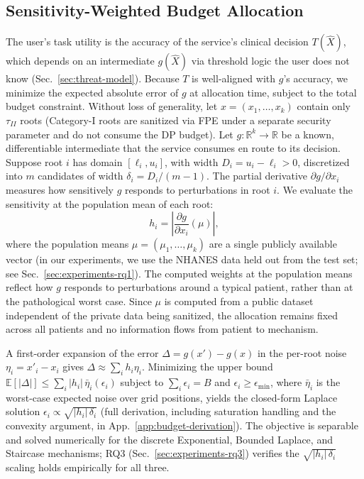 
\subsection{Sensitivity-Weighted Budget Allocation}
\label{sec:opt-budget}

\noindent The user's task utility is the accuracy of the service's clinical decision $T(\hat{X})$, which depends on an intermediate $g(\hat{X})$ via threshold logic the user does not know (Sec.~\ref{sec:threat-model}). Because $T$ is well-aligned with $g$'s accuracy, we minimize the expected absolute error of $g$ at allocation time, subject to the total budget constraint. Without loss of generality, let $x = (x_1, \dots,x_k)$ contain only $\tau_{II}$ roots (Category-I roots are sanitized via FPE under a separate security parameter and do not consume the DP budget). Let $g\colon \mathbb{R}^k \to \mathbb{R}$ be a known, differentiable intermediate that the service consumes en route to its decision. Suppose root $i$ has domain $[\ell_i, u_i]$, with width $D_i = u_i - \ell_i > 0$, discretized into $m$ candidates of width $\delta_i = D_i/(m-1)$. The partial derivative $\partial g / \partial x_i$ measures how sensitively $g$ responds to perturbations in root $i$. We evaluate the sensitivity at the population mean of each root:
\[
    h_i = \left|\frac{\partial g}{\partial x_i}(\mu)\right|,
\]
where the population means $\mu = (\mu_1, \dots, \mu_k)$ are a single publicly available vector (in our experiments, we use the NHANES data held out from the test set; see Sec.~\ref{sec:experiments-rq1}). The computed weights at the population means reflect how $g$ responds to perturbations around a typical patient, rather than at the pathological worst case. Since $\mu$ is computed from a public dataset independent of the private data being sanitized, the allocation remains fixed across all patients and no information flows from patient to mechanism. 

A first-order expansion of the error $\Delta = g(x') - g(x)$ in the per-root noise $\eta_i = x'_i - x_i$ gives $\Delta \approx \sum_i h_i \eta_i$. Minimizing the upper bound $\mathbb{E}[|\Delta|] \leq \sum_i |h_i|\,\bar{\eta}_i(\epsilon_i)$ subject to $\sum_i \epsilon_i = B$ and $\epsilon_i \geq \epsilon_{\min}$, where $\bar{\eta}_i$ is the worst-case expected noise over grid positions, yields the closed-form Laplace solution $\epsilon_i \propto \sqrt{|h_i|\,\delta_i}$ (full derivation, including saturation handling and the convexity argument, in App.~\ref{app:budget-derivation}). The objective is separable and solved numerically for the discrete Exponential, Bounded Laplace, and Staircase mechanisms; RQ3 (Sec.~\ref{sec:experiments-rq3}) verifies the $\sqrt{|h_i|\,\delta_i}$ scaling holds empirically for all three.

